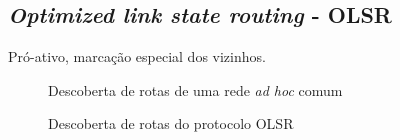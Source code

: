 \subsection{\textit{Optimized link state routing} - OLSR}
Pr\'o-ativo, marca\c{c}\~ao especial dos vizinhos.

\begin{figure}[H]
	\centering
	\label{subfig:olsrStep11}
	\label{subfig:olsrStep12}
	\label{subfig:olsrStep13}
	\label{subfig:olsrStep14}	
	\caption{Descoberta de rotas de uma rede \textit{ad hoc} comum}
	\label{fig:olsrComum}
\end{figure}

\begin{figure}[H]
	\centering
	\label{subfig:olsrStep21}
	\label{subfig:olsrStep22}
	\label{subfig:olsrStep23}
	\label{subfig:olsrStep24}	
	\caption{Descoberta de rotas do protocolo OLSR}
	\label{fig:olsrOperation}
\end{figure}
